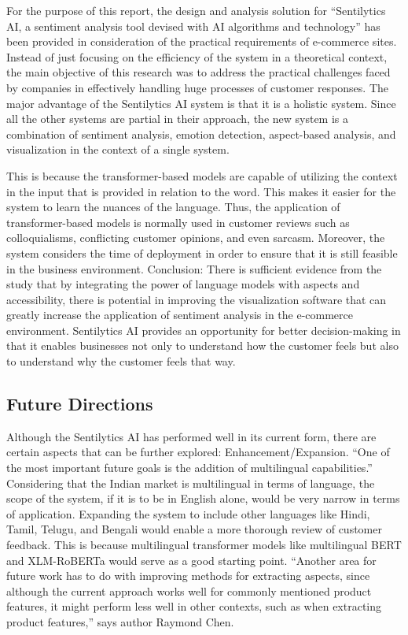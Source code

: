 \documentclass[11pt,a4paper]{article}
\begin{document}
For the purpose of this report, the design and analysis solution for “Sentilytics AI, a sentiment analysis tool devised with AI algorithms and technology” has been provided in consideration of the practical requirements of e-commerce sites. Instead of just focusing on the efficiency of the system in a theoretical context, the main objective of this research was to address the practical challenges faced by companies in effectively handling huge processes of customer responses.
The major advantage of the Sentilytics AI system is that it is a holistic system. Since all the other systems are partial in their approach, the new system is a combination of sentiment analysis, emotion detection, aspect-based analysis, and visualization in the context of a single system.

This is because the transformer-based models are capable of utilizing the context in the input that is provided in relation to the word. This makes it easier for the system to learn the nuances of the language. Thus, the application of transformer-based models is normally used in customer reviews such as colloquialisms, conflicting customer opinions, and even sarcasm. Moreover, the system considers the time of deployment in order to ensure that it is still feasible in the business environment.
Conclusion:
There is sufficient evidence from the study that by integrating the power of language models with aspects and accessibility, there is potential in improving the visualization software that can greatly increase the application of sentiment analysis in the e-commerce environment. Sentilytics AI provides an opportunity for better decision-making in that it enables businesses not only to understand how the customer feels but also to understand why the customer feels that way.

\subsection{Future Directions}

Although the Sentilytics AI has performed well in its current form, there are certain aspects that can be further explored:
Enhancement/Expansion. “One of the most important future goals is the addition of multilingual capabilities.”
Considering that the Indian market is multilingual in terms of language, the scope of the system, if it is to be in English alone, would be very narrow in terms of application. Expanding the system to include other languages like Hindi, Tamil, Telugu, and Bengali would enable a more thorough review of customer feedback. This is because multilingual transformer models like multilingual BERT and XLM-RoBERTa would serve as a good starting point.
“Another area for future work has to do with improving methods for extracting aspects, since although the current approach works well for commonly mentioned product features, it might perform less well in other contexts, such as when extracting product features,” says author Raymond Chen.
\end{document}
